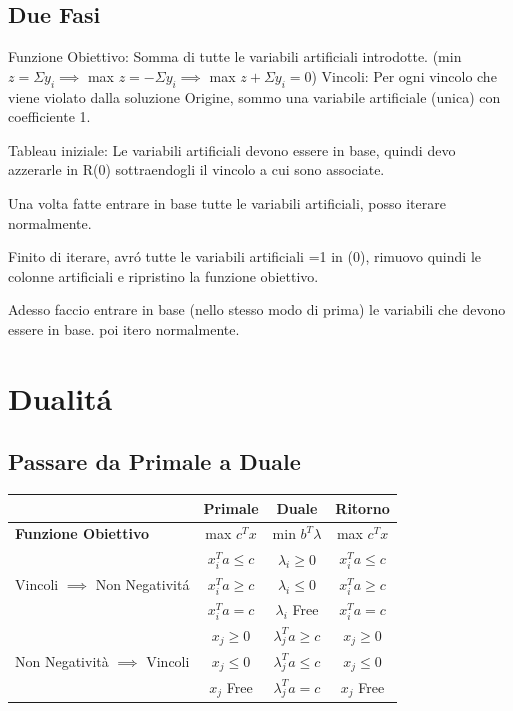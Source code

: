 \documentclass[12pt, a4paper, openany]{book}
\begin{document}
\subsection{Due Fasi}

Funzione Obiettivo: Somma di tutte le variabili artificiali introdotte. (min $z= \Sigma y_i \implies$ max $z= - \Sigma y_i \implies$ max $z+\Sigma y_i = 0$)
Vincoli: Per ogni vincolo che viene violato dalla soluzione Origine, sommo una variabile artificiale (unica) con coefficiente 1.

Tableau iniziale: Le variabili artificiali devono essere in base, quindi devo azzerarle in R(0) sottraendogli il vincolo a cui sono associate.

Una volta fatte entrare in base tutte le variabili artificiali, posso iterare normalmente.

Finito di iterare, avró tutte le variabili artificiali =1 in (0), rimuovo quindi le colonne artificiali e ripristino la funzione obiettivo.

Adesso faccio entrare in base (nello stesso modo di prima) le variabili che devono essere in base. poi itero normalmente.

\section{Dualitá}
\subsection{Passare da Primale a Duale}


\begin{tabular}{|l|c|c|c|}
	\hline
    & \textbf{Primale} & \textbf{Duale} & \textbf{Ritorno} \\
	\hline
    \textbf{Funzione Obiettivo} & max $c^T x$ & min $b^T \lambda$ & max $c^T x$ \\
    \hline
    \multirow{3}{*}{Vincoli $\implies$ Non Negativitá}
    &$x_i^Ta \leq c$ & $\lambda_i \geq 0$& $x_i^Ta \leq c$\\
	\cline{2-4}
    &$x_i^Ta \geq c$  & $\lambda_i \leq 0$&  $x_i^Ta \geq c$ \\
	\cline{2-4}
    &$x_i^Ta = c$ & $\lambda_i$ Free&  $x_i^Ta = c$\\
	\hline
    \multirow{3}{*}{Non Negatività $\implies$ Vincoli}
    &$x_j \geq 0 $ & $\lambda^T_ja \geq c$& $x_j \geq 0 $\\
	\cline{2-4}
    &$x_j \leq 0 $ & $\lambda^T_ja \leq c$& $x_j \leq 0 $\\
	\cline{2-4}
    &$x_j$ Free & $\lambda^T_ja = c$& $x_j$ Free\\
	\hline
\end{tabular}
\end{document}
